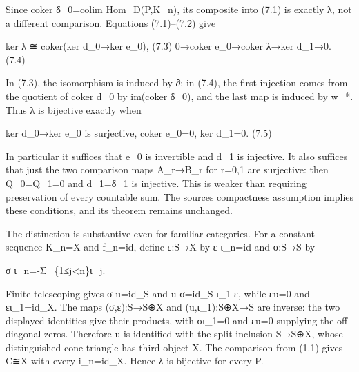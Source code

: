 Since coker δ\_\allowbreak{}0\allowbreak{}=colim Hom\_\allowbreak{}D(P,\allowbreak{}K\_\allowbreak{}n)\allowbreak{},\allowbreak{} its composite into (7.1)\allowbreak{} is exactly λ,\allowbreak{} not a different comparison. Equations (7.1)\allowbreak{}–\allowbreak{}(7.2)\allowbreak{} give

ker λ ≅ coker(ker d\_\allowbreak{}0\allowbreak{}→ker e\_\allowbreak{}0)\allowbreak{},\allowbreak{} (7.3)\allowbreak{} 0\allowbreak{}→coker e\_\allowbreak{}0\allowbreak{}→coker λ\allowbreak{}→ker d\_\allowbreak{}1\allowbreak{}→0. (7.4)\allowbreak{}

In (7.3)\allowbreak{},\allowbreak{} the isomorphism is induced by ∂; in (7.4)\allowbreak{},\allowbreak{} the first injection comes from the quotient of coker d\_\allowbreak{}0 by im(coker δ\_\allowbreak{}0)\allowbreak{},\allowbreak{} and the last map is induced by w\_\allowbreak{}*. Thus λ is bijective exactly when

ker d\_\allowbreak{}0\allowbreak{}→ker e\_\allowbreak{}0 is surjective,\allowbreak{} coker e\_\allowbreak{}0\allowbreak{}=0,\allowbreak{} ker d\_\allowbreak{}1\allowbreak{}=0. (7.5)\allowbreak{}

In particular it suffices that e\_\allowbreak{}0 is invertible and d\_\allowbreak{}1 is injective. It also suffices that just the two comparison maps A\_\allowbreak{}r\allowbreak{}→B\_\allowbreak{}r for r\allowbreak{}=0,\allowbreak{}1 are surjective:\allowbreak{} then Q\_\allowbreak{}0\allowbreak{}=Q\_\allowbreak{}1\allowbreak{}=0 and d\_\allowbreak{}1\allowbreak{}=δ\_\allowbreak{}1 is injective. This is weaker than requiring preservation of every countable sum. The source\textquotesingle s compactness assumption implies these conditions,\allowbreak{} and its theorem remains unchanged.

The distinction is substantive even for familiar categories. For a constant sequence K\_\allowbreak{}n\allowbreak{}=X and f\_\allowbreak{}n\allowbreak{}=id,\allowbreak{} define ε:\allowbreak{}S\allowbreak{}→X by ε ι\_\allowbreak{}n\allowbreak{}=id and σ:\allowbreak{}S\allowbreak{}→S by

σ ι\_\allowbreak{}n\allowbreak{}=-Σ\_\allowbreak{}\{1≤j<n\}ι\_\allowbreak{}j.

Finite telescoping gives σ u\allowbreak{}=id\_\allowbreak{}S and u σ\allowbreak{}=id\_\allowbreak{}S-ι\_\allowbreak{}1 ε,\allowbreak{} while εu\allowbreak{}=0 and ει\_\allowbreak{}1\allowbreak{}=id\_\allowbreak{}X. The maps (σ,\allowbreak{}ε)\allowbreak{}:\allowbreak{}S\allowbreak{}→S\allowbreak{}⊕X and (u,\allowbreak{}ι\_\allowbreak{}1)\allowbreak{}:\allowbreak{}S\allowbreak{}⊕X\allowbreak{}→S are inverse:\allowbreak{} the two displayed identities give their products,\allowbreak{} with σι\_\allowbreak{}1\allowbreak{}=0 and εu\allowbreak{}=0 supplying the off-diagonal zeros. Therefore u is identified with the split inclusion S\allowbreak{}→S\allowbreak{}⊕X,\allowbreak{} whose distinguished cone triangle has third object X. The comparison from (1.1)\allowbreak{} gives C≅X with every i\_\allowbreak{}n\allowbreak{}=id\_\allowbreak{}X. Hence λ is bijective for every P.

